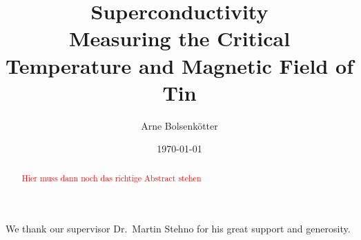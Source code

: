 \documentclass[%
a4paper,
reprint, %
superscriptaddress,
aps,
prb,
]{revtex4-2}
\begin{document}

\title{Superconductivity\texorpdfstring{\\}{PDFstring}Measuring the Critical Temperature and Magnetic Field of Tin}


\author{Arne Bolsenkötter}

\date{\today}

\begin{abstract}
\textcolor{red}{Hier muss dann noch das richtige Abstract stehen}
\end{abstract}

\maketitle


% 
% 
% 
% 
% 

\begin{acknowledgements}
We thank our supervisor Dr.\ Martin Stehno for his great support and generosity.
\end{acknowledgements}

\appendix

\nocite{*}  %

\end{document}
